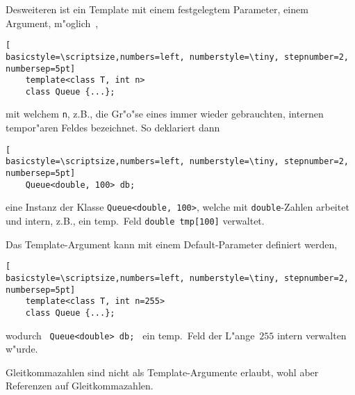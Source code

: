 Desweiteren ist ein Template mit einem festgelegtem Parameter, einem Argument,
m"oglich~\cite[p.397ff]{KirchPrinz:2002:OOP},
%
\begin{lstlisting}[
basicstyle=\scriptsize,numbers=left, numberstyle=\tiny, stepnumber=2, numbersep=5pt]
    template<class T, int n>
    class Queue {...};
\end{lstlisting}
mit welchem \texttt{n}, z.B., die Gr"o"se eines immer wieder gebrauchten,
internen tempor"aren Feldes bezeichnet. So deklariert dann
%
\begin{lstlisting}[
basicstyle=\scriptsize,numbers=left, numberstyle=\tiny, stepnumber=2, numbersep=5pt]
    Queue<double, 100> db;
\end{lstlisting}
eine Instanz der Klasse \verb|Queue<double, 100>|, welche mit \verb|double|-Zahlen
arbeitet und intern, z.B., ein temp.\  Feld \verb|double tmp[100]| verwaltet.

Das Template-Argument kann mit einem Default-Parameter definiert werden,
%
\begin{lstlisting}[
basicstyle=\scriptsize,numbers=left, numberstyle=\tiny, stepnumber=2, numbersep=5pt]
    template<class T, int n=255>
    class Queue {...};
\end{lstlisting}
wodurch \verb| Queue<double> db; |  ein temp.\  Feld der L"ange~$255$ intern verwalten
w"urde.

Gleitkommazahlen sind nicht als Template-Argumente erlaubt, wohl aber Referenzen auf
Gleitkommazahlen.
%
%
